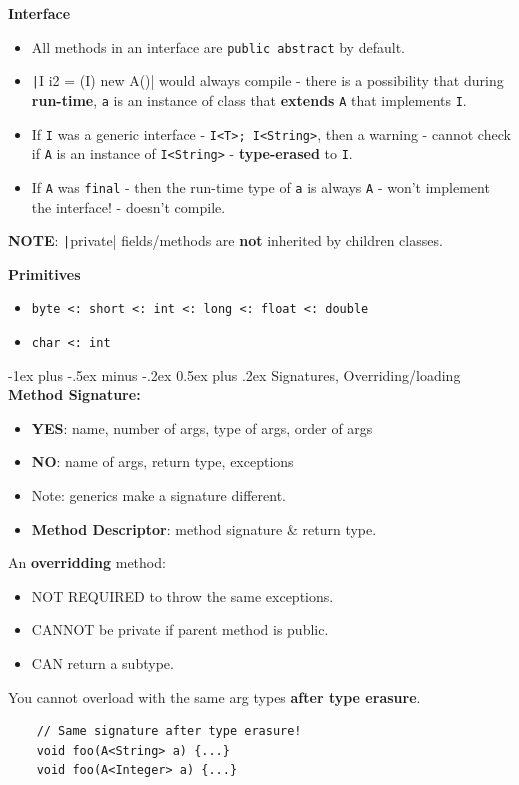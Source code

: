 \documentclass[10pt, landscape]{article}
\makeatletter
\renewcommand{\section}{\@startsection{section}{1}{0mm}%
                                {-1ex plus -.5ex minus -.2ex}%
                                {0.5ex plus .2ex}%
                                {\normalfont\large\bfseries}}
\newcommand{\code}[1]{\textcolor{mygreen}{\texttt{#1}}}
\newcommand{\java}[1]{\texttt|#1|}
\makeatother
\begin{document}
\begin{multicols}{2}
\begin{multicols}{2}
\textbf{Interface}
\begin{itemize}
    \item All methods in an interface are \code{public abstract} by default.
    \item \java{I i2 = (I) new A()} would always compile - there is a possibility that during \textbf{run-time}, \code{a} is an instance of class that \textbf{extends} \code{A} that implements \code{I}. 
    \item If \code{I} was a generic interface - \code{I<T>; I<String>}, then a warning - cannot check if \code{A} is an instance of \code{I<String>} - \textbf{type-erased} to \code{I}.
    \item If \code{A} was \code{final} - then the run-time type of \code{a} is always \code{A} - won't implement the interface! - doesn't compile. 
\end{itemize} 
\end{multicols}

\vspace{3 pt}
\textbf{NOTE}: \java{private} fields/methods are \textbf{not} inherited by children classes. 
\vspace{3 pt}

\textbf{Primitives}
\begin{itemize}
    \item \code{byte <: short <: int <: long <: float <: double}
    \item \code{char <: int}
\end{itemize}



\section{Signatures, Overriding/loading}
\textbf{Method Signature:}
\begin{itemize}
    \item \textbf{YES}: name, number of args, type of args, order of args
    \item \textbf{NO}: name of args, return type, exceptions
    \item Note: generics make a signature different.
    \item \textbf{Method Descriptor}: method signature \& return type.
\end{itemize}

\vspace{2 pt}
An \textbf{overridding} method:
\begin{itemize}
    \item NOT REQUIRED to throw the same exceptions.
    \item CANNOT be private if parent method is public.
    \item CAN return a subtype.
\end{itemize}
You cannot overload with the same arg types \textbf{after type erasure}. 
\begin{verbatim}
    // Same signature after type erasure!
    void foo(A<String> a) {...} 
    void foo(A<Integer> a) {...}
\end{verbatim}



\end{multicols}
\end{document}
